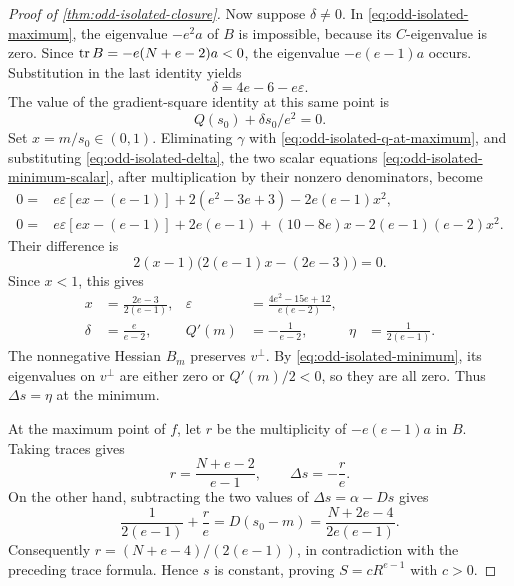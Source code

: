\begin{proof}[Proof of \cref{thm:odd-isolated-closure}]
Now suppose \(\delta\ne0\). In
\eqref{eq:odd-isolated-maximum}, the eigenvalue \(-e^2a\) of
\(B\) is impossible, because its \(C\)-eigenvalue is zero.
Since \(\operatorname{tr} B=-e(N+e-2)a<0\), the eigenvalue
\(-e(e-1)a\) occurs. Substitution in the last identity yields
\begin{equation}\label{eq:odd-isolated-delta}
 \delta=4e-6-e\varepsilon.
\end{equation}
The value of the gradient-square identity at this same point is
\begin{equation}\label{eq:odd-isolated-q-at-maximum}
 Q(s_0)+\delta s_0/e^2=0.
\end{equation}
Set \(x=m/s_0\in(0,1)\). Eliminating \(\gamma\) with
\eqref{eq:odd-isolated-q-at-maximum}, and substituting
\eqref{eq:odd-isolated-delta}, the two scalar equations
\eqref{eq:odd-isolated-minimum-scalar}, after multiplication by
their nonzero denominators, become
\begin{align*}
 0={}&e\varepsilon[ex-(e-1)]
       +2(e^2-3e+3)-2e(e-1)x^2,\\
 0={}&e\varepsilon[ex-(e-1)]
       +2e(e-1)+(10-8e)x-2(e-1)(e-2)x^2.
\end{align*}
Their difference is
\[
 2(x-1)\bigl(2(e-1)x-(2e-3)\bigr)=0.
\]
Since \(x<1\), this gives
\begin{equation}\label{eq:odd-isolated-forced-coefficients}
 \begin{aligned}
 x&=\frac{2e-3}{2(e-1)},&
 \varepsilon&=\frac{4e^2-15e+12}{e(e-2)},\\
 \delta&=\frac e{e-2},&
 Q'(m)&=-\frac1{e-2},&
 \eta&=\frac1{2(e-1)}.
 \end{aligned}
\end{equation}
The nonnegative Hessian \(B_m\) preserves \(v^\perp\). By
\eqref{eq:odd-isolated-minimum}, its eigenvalues on \(v^\perp\)
are either zero or \(Q'(m)/2<0\), so they are all zero. Thus
\(\Delta s=\eta\) at the minimum.

At the maximum point of \(f\), let \(r\) be the multiplicity
of \(-e(e-1)a\) in \(B\). Taking traces gives
\[
 r=\frac{N+e-2}{e-1},\qquad \Delta s=-\frac re.
\]
On the other hand, subtracting the two values of
\(\Delta s=\alpha-Ds\) gives
\[
 \frac1{2(e-1)}+\frac re
 =D(s_0-m)=\frac{N+2e-4}{2e(e-1)}.
\]
Consequently \(r=(N+e-4)/(2(e-1))\), in contradiction with
the preceding trace formula. Hence \(s\) is constant, proving
\(S=cR^{e-1}\) with \(c>0\).


\end{proof}
